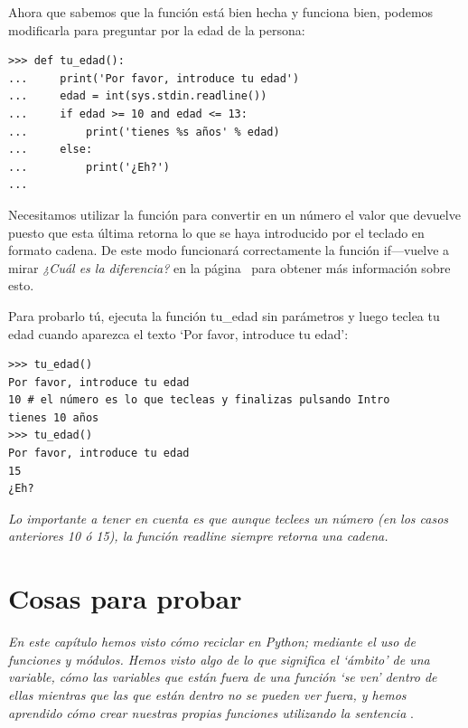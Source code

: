 Ahora que sabemos que la función está bien hecha y funciona bien, podemos modificarla para preguntar por la edad de la persona:

\begin{listing}
\begin{verbatim}
>>> def tu_edad():
...     print('Por favor, introduce tu edad')
...     edad = int(sys.stdin.readline())
...     if edad >= 10 and edad <= 13:
...         print('tienes %s años' % edad)
...     else:
...         print('¿Eh?')
... 
\end{verbatim}
\end{listing}

Necesitamos utilizar la función  para convertir en un número el valor que devuelve  puesto que esta última retorna lo que se haya introducido por el teclado en formato cadena. De este modo funcionará correctamente la función if---vuelve a mirar \emph{¿Cuál es la diferencia?} en la página~\pageref{whatsthedifference} para obtener más información sobre esto.  

Para probarlo tú, ejecuta la función tu\_edad sin parámetros y luego teclea tu edad cuando aparezca el texto `Por favor, introduce tu edad':

\begin{listingignore}
\begin{verbatim}
>>> tu_edad()
Por favor, introduce tu edad
10 # el número es lo que tecleas y finalizas pulsando Intro
tienes 10 años
>>> tu_edad()
Por favor, introduce tu edad
15
¿Eh?
\end{verbatim}
\end{listingignore}

\noindent
\emph{Lo importante a tener en cuenta es que aunque teclees un número (en los casos anteriores 10 ó 15), la función readline siempre retorna una cadena.}


\section{Cosas para probar}

\emph{En este capítulo hemos visto cómo reciclar en Python; mediante el uso de funciones y módulos.  Hemos visto algo de lo que significa el `ámbito' de una variable, cómo las variables que están fuera de una función `se ven' dentro de ellas mientras que las que están dentro no se pueden ver fuera, y hemos aprendido cómo crear nuestras propias funciones utilizando la sentencia }.

